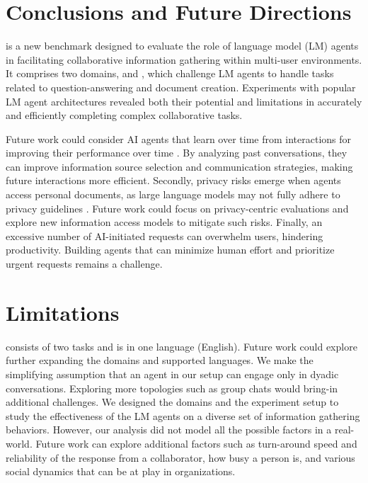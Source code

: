 \section{Conclusions and Future Directions}

\asyncfw{} is  a new benchmark designed to evaluate the role of language model (LM) agents in facilitating collaborative information gathering within multi-user environments. %
It comprises two domains, \dataspider{} and \datanews{}, which challenge LM  agents to handle tasks related to question-answering and document creation. Experiments with popular LM agent architectures revealed both their potential and limitations in accurately and efficiently completing complex collaborative tasks. 

Future work could consider AI agents that learn over time from interactions for improving their performance over time \cite{lewis1998designing}. By analyzing past conversations, they can improve information source selection and communication strategies, making future interactions more efficient. 
Secondly, privacy risks emerge when agents access personal documents, as large language models may not fully adhere to privacy guidelines \cite{mireshghallah2023can}. Future work could focus on privacy-centric evaluations and explore new information access models to mitigate such risks.
Finally, an excessive number of AI-initiated requests can overwhelm users, hindering productivity. Building agents that can minimize human effort and prioritize urgent requests remains a challenge. %

\section*{Limitations}

\asyncfw{} consists of two tasks and is in one language (English). Future work could explore further expanding the domains and supported languages.
We make the simplifying assumption that an agent in our setup can engage only in dyadic conversations. Exploring more topologies such as group chats \cite{wu2023autogen} would bring-in additional challenges. 
We designed the domains and the experiment setup to study the effectiveness of the LM agents on a diverse set of information gathering behaviors. However, our analysis did not model all the possible factors in a real-world. Future work can explore additional factors such as turn-around speed and reliability of the response from a collaborator, how busy a person is, and various social dynamics that can be at play in organizations. %



